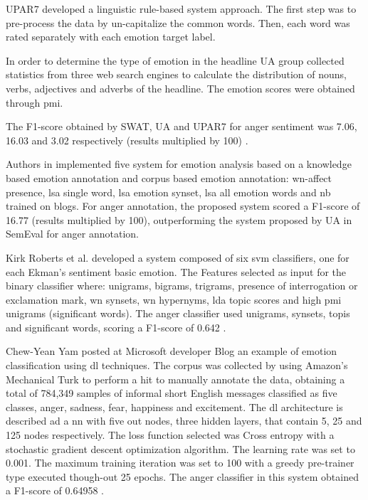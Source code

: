 UPAR7 developed a linguistic rule-based system approach. The first step was to pre-process the data by un-capitalize the common words. Then, each word was rated separately with each emotion target label. 

In order to determine the type of emotion in the headline UA group collected statistics from three web search engines to calculate the distribution of nouns, verbs, adjectives and adverbs of the headline. The emotion scores were obtained through \acrfull{pmi}.

The F1-score obtained by SWAT, UA and UPAR7 for anger sentiment was 7.06, 16.03 and 3.02 respectively (results multiplied by 100) \cite{strapparava2007semeval}.

Authors in \cite{strapparava2008learning} implemented five system for emotion analysis based on a knowledge based emotion annotation and corpus based emotion annotation: \acrshort{wn}-affect presence, \acrshort{lsa} single word, \acrshort{lsa} emotion synset, \acrshort{lsa} all emotion words and \acrshort{nb} trained on blogs. For anger annotation, the proposed system scored a F1-score of 16.77 (results multiplied by 100), outperforming the system proposed by UA in SemEval for anger annotation.

Kirk Roberts et al. developed a system composed of six \acrshort{svm} classifiers, one for each Ekman's sentiment basic emotion. The Features selected as input for the binary classifier where: unigrams, bigrams, trigrams, presence of interrogation or exclamation mark, \acrlong{wn} synsets, \acrshort{wn} hypernyms, \acrlong{lda} topic scores and high \acrshort{pmi} unigrams (significant words). The anger classifier used unigrams, synsets, topis and significant words, scoring a F1-score of 0.642 \cite{roberts2012empatweet}.

Chew-Yean Yam posted at Microsoft developer Blog an example of emotion classification using \acrfull{dl} techniques. The corpus was collected by using Amazon's Mechanical Turk to perform a \acrfull{hit} to manually annotate the data, obtaining a total of 784,349 samples of informal short English messages classified as five classes, anger, sadness, fear, happiness and excitement. The \acrshort{dl} architecture is described ad a \acrfull{nn} with five out nodes, three hidden layers, that contain 5, 25 and 125 nodes respectively. The loss function selected was Cross entropy with a stochastic gradient descent optimization algorithm. The learning rate was set to 0.001. The maximum training iteration was set to 100 with a greedy pre-trainer type executed though-out 25 epochs. The anger classifier in this system obtained a F1-score of 0.64958 \cite{microsoftEmotionAPI}.

